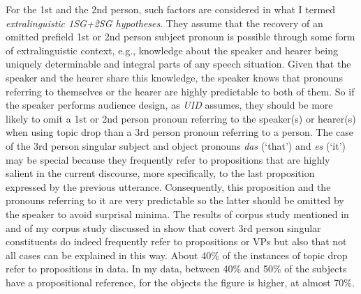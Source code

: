 For the 1st and the 2nd person, such factors are considered in what I termed \textit{extralinguistic 1SG+2SG hypotheses}.
They assume that the recovery of an omitted prefield 1st or 2nd person subject pronoun is possible through some form of extralinguistic context, e.g., knowledge about the speaker and hearer being uniquely determinable and integral parts of any speech situation.
Given that the speaker and the hearer share this knowledge, the speaker knows that pronouns referring to themselves or the hearer are highly predictable  to both of them.
So if the speaker performs audience design,  as \textit{UID}  assumes, they should be more likely to omit a 1st or 2nd person pronoun referring to the speaker(s) or hearer(s) when using topic drop than a 3rd person pronoun referring to a person.
The case of the 3rd person singular subject and object pronouns \textit{das} (`that') and \textit{es} (`it') may be special because they frequently refer to propositions that are highly salient  in the current discourse, more specifically, to the last proposition expressed by the previous utterance.
Consequently, this proposition and the pronouns referring to it are very predictable  so the latter should be omitted by the speaker to avoid surprisal minima.
The results of  corpus study mentioned in  and of my corpus study discussed in  show that covert 3rd person singular constituents do indeed frequently refer to propositions or VPs  but also that not all cases can be explained in this way.
About 40\% of the instances of topic drop refer to propositions in  data.
In my data, between 40\% and 50\% of the subjects have a propositional reference, for the objects the figure is higher, at almost 70\%.

